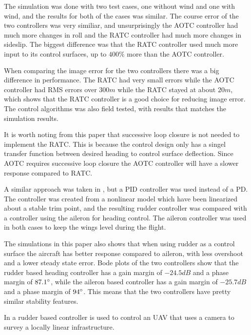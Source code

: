The simulation was done with two test cases, one without wind and one with wind, and the results for both of the cases was similar. The course error of the two controllers was very similiar, and unsurprisingly the AOTC controller had much more changes in roll and the RATC controller had much more changes in sideslip. The biggest difference was that the RATC controller used much more input to its control surfaces, up to $400 \%$ more than the AOTC controller.

When comparing the image error for the two controllers there was a big difference in performance. The RATC had very small errors while the AOTC controller had RMS errors over $300 m$ while the RATC stayed at about $20 m$, which shows that the RATC controller is a good choice for reducing image error. The control algorithms was also field tested, with results that matches the simulation results.

It is worth noting from this paper that successive loop closure is not needed to implement the RATC. This is because the control design only has a singel transfer function between desired heading to control surface deflection. Since AOTC requires successive loop closure the AOTC controller will have a slower response compared to RATC.

A similar approach was taken in \cite{alternateSurfaceAhsan}, but a PID controller was used instead of a PD. The controller was created from a nonlinear model which have been linearized about a stable trim point, and the resulting rudder controller was compared with a controller using the aileron for heading control. The aileron controller was used in both cases to keep the wings level during the flight.

The simulations in this paper also shows that when using rudder as a control surface the aircraft has better response compared to aileron, with less overshoot and a lower steady state error. Bode plots of the two controllers show that the rudder based heading controller has a gain margin of $-24.5 dB$ and a phase margin of $87.1 \degree$, while the aileron based controller has a gain margin of $-25.7 dB$ and a phase margin of $94 \degree$. This means that the two controllers have pretty similar stability features.

In \cite{skidToTurnMills} a rudder based controller is used to control an UAV that uses a camera to survey a locally linear infrastructure.